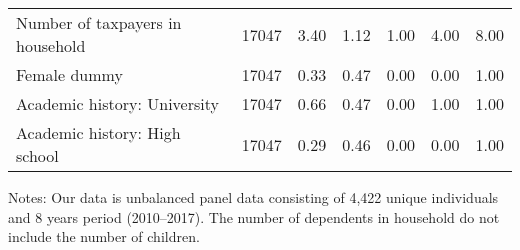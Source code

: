 \begin{table}
\begin{threeparttable}
\begin{tabular}[t]{lcccccc}
\hspace{1em}Number of taxpayers in household & 17047 & \num{3.40} & \num{1.12} & \num{1.00} & \num{4.00} & \num{8.00}\\
\hspace{1em}Female dummy & 17047 & \num{0.33} & \num{0.47} & \num{0.00} & \num{0.00} & \num{1.00}\\
\hspace{1em}Academic history: University & 17047 & \num{0.66} & \num{0.47} & \num{0.00} & \num{1.00} & \num{1.00}\\
\hspace{1em}Academic history: High school & 17047 & \num{0.29} & \num{0.46} & \num{0.00} & \num{0.00} & \num{1.00}\\
\bottomrule
\end{tabular}
\begin{tablenotes}
\item Notes: Our data is unbalanced panel data consisting of 4,422 unique individuals and 8 years period (2010--2017). The number of dependents in household do not include the number of children.
\end{tablenotes}
\end{threeparttable}
\end{table}
